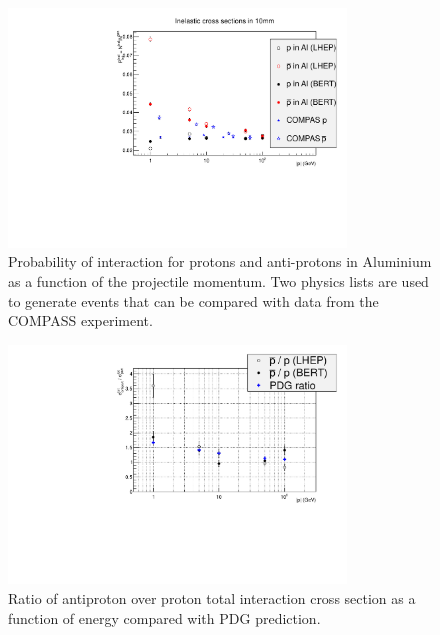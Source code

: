 \begin{center}
\begin{figure}[h]
\centering \includegraphics[width=0.8\textwidth]{Detector/figs/validation/General/pCompData_10mm.pdf}
\caption{Probability of interaction for protons and anti-protons in Aluminium as a function of the projectile momentum.
Two physics lists are used to generate events that can be compared with data from the COMPASS experiment.}
\label{fig:AllXsec}
\end{figure}

\begin{figure}[h!]
\centering \includegraphics[width=0.8\textwidth]{Detector/figs/validation/ProtonsRatio_2.pdf}
\caption{Ratio of antiproton over proton total interaction cross section as a function of energy compared with PDG prediction.}
\label{fig:ProtonsRatios}
\end{figure}


\end{center}
